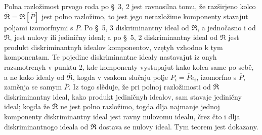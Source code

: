 \documentclass[11pt]{article}
\begin{document}
\setcounter{footnote}{27}

Polna razložimost prvogo roda po \S~3, 2 jest ravnosilna tomu, že razširjeno kolco $\overline{\mathfrak R}=\mathfrak R[\overline P]$ jest polno razložimo, to jest jego nerazložime komponenty stavajut poljami izomorfnymi s $\overline P$. Po \S~5, 3 diskriminantny ideal od $\mathfrak R$, a jednočasno i od $\overline{\mathfrak R}$, jest nulovy ili jediničny ideal; a po \S~5, 2 diskriminantny ideal od $\overline{\mathfrak R}$ jest produkt diskriminantnyh idealov komponentov, vzętyh vzhodno k tym komponentam. Te pojedine diskriminantne idealy nastavajut iz onyh razsmotrenyh v punktu 2, kde komponenty vystupajut kako kolca same po sebě, a ne kako idealy od $\overline{\mathfrak R}$, kogda v vsakom slučaju polje $P_i=\overline P e_i$, izomorfno s $\overline P$, zaměnja se samym $\overline P$. Iz togo slěduje, že pri polnoj razložimosti od $\overline{\mathfrak R}$ diskriminantny ideal, kako produkt jediničnyh idealov, sam stavaje jediničny ideal; kogda že $\overline{\mathfrak R}$ ne jest polno razložimo, togda dlja najmanje jednoj komponenty diskriminantny ideal jest ravny nulovomu idealu, črez čto i dlja diskriminantnogo ideala od $\overline{\mathfrak R}$ dostava se nulovy ideal. Tym teorem jest dokazany.
\end{document}
